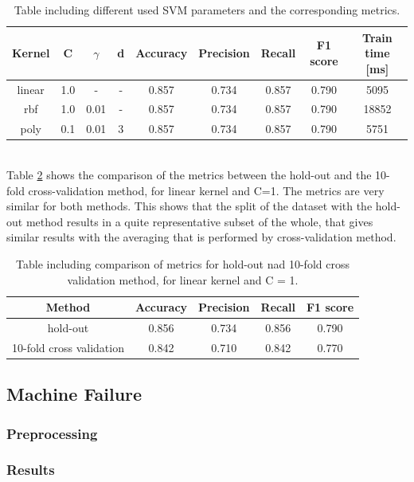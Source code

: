 \documentclass{article}
\begin{document}
\begin{table}[h!]
\centering
\begin{tabular}{||c c c c c c c c c||} 
 \hline
 Kernel & C & $\gamma$ &d & Accuracy & Precision & Recall & F1 score & Train time [ms] \\ [0.5ex] 
 \hline\hline
 linear &  1.0 & - & - & 0.857 & 0.734 & 0.857 & 0.790 & 5095 \\
  rbf &  1.0 & 0.01 & - & 0.857 & 0.734 & 0.857 & 0.790 & 18852\\
 poly &  0.1 & 0.01 & 3 & 0.857 & 0.734 & 0.857 & 0.790 & 5751 \\[1ex] 
 \hline
\end{tabular}
\caption{Table including different used SVM parameters and the corresponding metrics.}
\label{table:rta_SVM}
\end{table}
\\
Table \ref{table:rta_SVM_cross} shows the comparison of the metrics between the hold-out and the 10-fold cross-validation method, for linear kernel and C=1. The metrics are very similar for both methods. This shows that the split of the dataset with the hold-out method results in a quite representative subset of the whole, that gives similar results with the averaging that is performed by cross-validation method.
\begin{table}[h!]
\centering
\begin{tabular}{||c c c c c||} 
 \hline
Method &  Accuracy & Precision & Recall & F1 score \\ [0.5ex] 
 \hline\hline
hold-out & 0.856 & 0.734 & 0.856 & 0.790  \\  
 10-fold cross validation &  0.842&  0.710 & 0.842& 0.770 \\ [1ex] 
 \hline
\end{tabular}
\caption{Table including comparison of metrics for hold-out nad 10-fold cross validation method, for linear kernel and C = 1.}
\label{table:rta_SVM_cross}
\end{table}
\subsection{Machine Failure}
\subsubsection{Preprocessing}
\subsubsection{Results}
\end{document}
